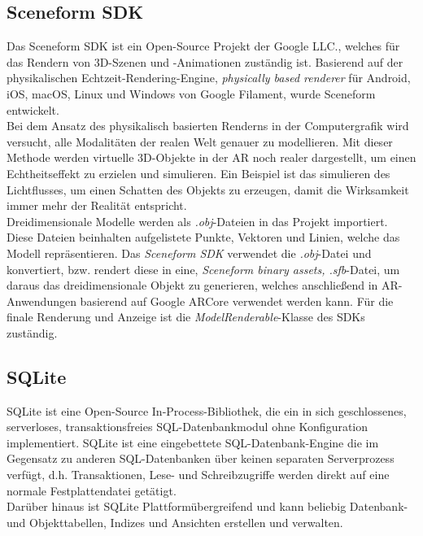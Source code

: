 \subsection{Sceneform SDK}
Das Sceneform \acs{SDK} ist ein Open-Source Projekt der Google LLC., welches für das Rendern von 3D-Szenen und -Animationen zuständig ist. 
Basierend auf der physikalischen Echtzeit-Rendering-Engine, \textit{physically based renderer} für Android, iOS, macOS, Linux und Windows 
von Google Filament, wurde Sceneform entwickelt. 
\\ 
\linebreak
Bei dem Ansatz des physikalisch basierten Renderns in der Computergrafik wird versucht, alle Modalitäten der realen Welt genauer zu modellieren. 
Mit dieser Methode werden virtuelle 3D-Objekte in der \acl{AR} noch realer dargestellt, um einen Echtheitseffekt zu erzielen und simulieren. 
Ein Beispiel ist das simulieren des Lichtflusses, um einen Schatten des Objekts zu erzeugen, damit die Wirksamkeit immer mehr der Realität 
entspricht.
\\ 
\linebreak
Dreidimensionale Modelle werden als \textit{.obj}-Dateien in das Projekt importiert. Diese Dateien beinhalten aufgelistete Punkte, Vektoren 
und Linien, welche das Modell repräsentieren. Das \textit{Sceneform \acs{SDK}} verwendet die \textit{.obj}-Datei und konvertiert, bzw. 
rendert diese in eine, \textit{Sceneform binary assets, .sfb}-Datei, um daraus das dreidimensionale Objekt zu generieren, welches anschließend 
in \acs{AR}-Anwendungen basierend auf Google ARCore verwendet werden kann. Für die finale Renderung und Anzeige ist die 
\textit{ModelRenderable}-Klasse des \acs{SDK}s zuständig. 
\subsection{SQLite}
\acs{SQL}ite ist eine Open-Source In-Process-Bibliothek, die ein in sich geschlossenes, serverloses, transaktionsfreies \acs{SQL}-Datenbankmodul 
ohne Konfiguration implementiert. \acs{SQL}ite ist eine eingebettete \acs{SQL}-Datenbank-Engine die im Gegensatz zu anderen \acs{SQL}-Datenbanken über 
keinen separaten Serverprozess verfügt, d.h. Transaktionen, Lese- und Schreibzugriffe werden direkt auf eine normale Festplattendatei getätigt. \cite{sqlite.2018j}
\\
Darüber hinaus ist \acs{SQL}ite Plattformübergreifend und kann beliebig Datenbank- und Objekttabellen, Indizes und Ansichten erstellen und verwalten. 